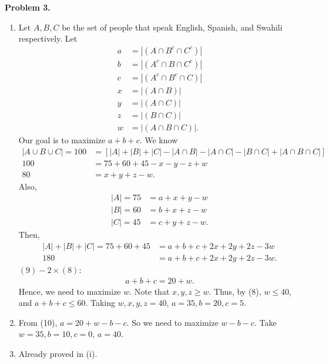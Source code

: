 \documentclass{article}
\begin{document}
\textbf{Problem 3.}
\begin{enumerate}[label={(\roman*)}]
    \item 
    Let $A,B,C$ be the set of people that speak English, Spanish, and Swahili respectively.
    Let 
    \begin{align}
        a&=|(A\cap B^c\cap C^c)|\nonumber\\
        b&=|(A^c\cap B\cap C^c)|\nonumber\\
        c&=|(A^c\cap B^c\cap C)|\nonumber\\
        x&=|(A\cap B)|\nonumber\\
        y&=|(A\cap C)|\nonumber\\
        z&=|(B \cap C)|\nonumber\\
        w&=|(A\cap B\cap C)|.\nonumber
    \end{align}
    Our goal is to maximize $a+b+c$.
    We know
    \begin{align}
        |A\cup B\cup C| = 100 &=\left[|A|+|B|+|C|-|A\cap B|-|A\cap C|-|B\cap C|+|A\cap B\cap C|\right] \nonumber\\
        100 &=75+60+45-x-y-z+w \nonumber\\
    80 &=x+y+z-w.
\end{align}
Also, 
\begin{align}
    |A| = 75& =a+x+y-w\nonumber \\
    |B| = 60& =b+x+z-w\nonumber \\
    |C| = 45& =c+y+z-w. \nonumber
\end{align}
Then,
\begin{align}
    |A|+|B|+|C|=75+60+45&=a+b+c+2x+2y+2z-3w \nonumber \\
    180& = a+b+c+2x+2y+2z-3w.
\end{align}
$(9)-2\times(8)$:
\begin{align}
    a+b+c=20+w.
\end{align}
Hence, we need to maximize $w$. Note that $x,y,z\ge w$. Thus, by (8), $w\le 40$, and $a+b+c\le 60$.
Taking $w,x,y,z=40$, $a=35,b=20,c=5$.
    
    \item 
    From (10), $a=20+w-b-c$. So we need to maximize $w-b-c$. Take $w=35, b=10, c=0$, $a=40$.

    \item 
    Already proved in (i). 
\end{enumerate}
\end{document}
